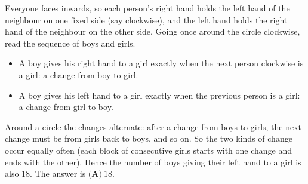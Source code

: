 Everyone faces inwards, so each person's right hand holds the left hand of the neighbour on one fixed side (say clockwise), and the left hand holds the right hand of the neighbour on the other side. Going once around the circle clockwise, read the sequence of boys and girls.
\begin{itemize}
\item A boy gives his right hand to a girl exactly when the next person clockwise is a girl: a change from boy to girl.
\item A boy gives his left hand to a girl exactly when the previous person is a girl: a change from girl to boy.
\end{itemize}
Around a circle the changes alternate: after a change from boys to girls, the next change must be from girls back to boys, and so on. So the two kinds of change occur equally often (each block of consecutive girls starts with one change and ends with the other). Hence the number of boys giving their left hand to a girl is also $18$. The answer is $\boxed{\textbf{(A)}\ 18}$.
